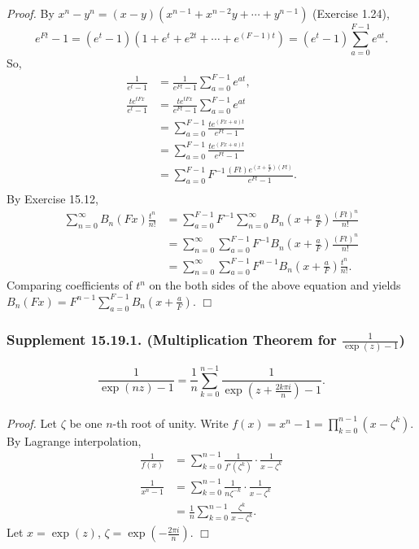 \documentclass{article}
\begin{document}
\emph{Proof.}
By $x^n - y^n = (x - y)(x^{n-1} + x^{n-2}y + \cdots + y^{n-1})$ (Exercise 1.24),
$$e^{Ft} - 1
= (e^t - 1)(1 + e^t + e^{2t} + \cdots + e^{(F-1)t})
= (e^t - 1) \sum_{a=0}^{F-1} e^{at}.$$
So,
\begin{align*}
\frac{1}{e^t - 1}
&= \frac{1}{e^{Ft} - 1} \sum_{a=0}^{F-1} e^{at}, \\
\frac{te^{tFx}}{e^t - 1}
&= \frac{te^{tFx}}{e^{Ft} - 1} \sum_{a=0}^{F-1} e^{at} \\
&= \sum_{a=0}^{F-1} \frac{te^{(Fx+a)t}}{e^{Ft} - 1} \\
&= \sum_{a=0}^{F-1} \frac{te^{(Fx+a)t}}{e^{Ft} - 1} \\
&= \sum_{a=0}^{F-1} F^{-1} \frac{(Ft) e^{(x + \frac{a}{F})(Ft)}}{e^{Ft} - 1}. \\
\end{align*}
By Exercise 15.12,
\begin{align*}
\sum_{n=0}^{\infty} B_n(Fx) \frac{t^n}{n!}
&= \sum_{a=0}^{F-1} F^{-1}
\sum_{n=0}^{\infty} B_n \left( x + \frac{a}{F} \right) \frac{(Ft)^n}{n!} \\
&= \sum_{n=0}^{\infty} \sum_{a=0}^{F-1} F^{-1}
B_n \left( x + \frac{a}{F} \right) \frac{(Ft)^n}{n!} \\
&= \sum_{n=0}^{\infty} \sum_{a=0}^{F-1} F^{n-1}
B_n \left( x + \frac{a}{F} \right) \frac{t^n}{n!}.
\end{align*}
Comparing coefficients of $t^n$ on the both sides of the above equation
and yields
$B_n(Fx) = F^{n-1} \sum_{a=0}^{F-1} B_n \left(x + \frac{a}{F} \right)$.
$\Box$ \\



\subsubsection*{Supplement 15.19.1. (Multiplication Theorem for $\frac{1}{\exp(z) - 1}$)}
\emph{$$\frac{1}{\exp(nz) - 1}
= \frac{1}{n} \sum_{k=0}^{n-1} \frac{1}{\exp(z + \frac{2 k \pi i}{n}) - 1}.$$} \\
\emph{Proof.}
Let $\zeta$ be one $n$-th root of unity.
Write $f(x) = x^n - 1 = \prod_{k=0}^{n-1}(x - \zeta^k)$.
By Lagrange interpolation,
\begin{align*}
\frac{1}{f(x)}
&=
\sum_{k=0}^{n-1} \frac{1}{f'(\zeta^k)} \cdot \frac{1}{x - \zeta^k} \\
\frac{1}{x^n - 1}
&= \sum_{k=0}^{n-1} \frac{1}{n \zeta^{-k}} \cdot \frac{1}{x - \zeta^k} \\
&= \frac{1}{n} \sum_{k=0}^{n-1} \frac{\zeta^k}{x - \zeta^k}.
\end{align*}
Let $x = \exp(z)$, $\zeta = \exp(-\frac{2 \pi i}{n})$.
$\Box$ \\
\end{document}
